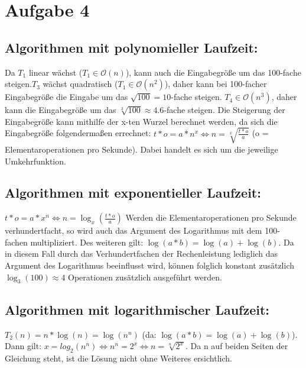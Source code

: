 \documentclass[a4paper,10pt]{article}
\begin{document}
\section{Aufgabe 4}
\subsection{Algorithmen mit polynomieller Laufzeit:}
Da $T_1$ linear wächst ($T_1 \in \mathcal{O}(n)$), kann auch die Eingabegröße um das 100-fache steigen.\newline $T_3$ wächst quadratisch
($T_1 \in \mathcal{O}(n^2)$), daher kann bei 100-facher Eingabegröße die Eingabe um das $\sqrt{100} = 10$-fache steigen. \newline $T_4 \in \mathcal{O}(n^3)$,
daher kann die Eingabegröße um das $\sqrt[3]{100} \approx 4.6$-fache steigen.\newline
Die Steigerung der Eingabegröße kann mithilfe der x-ten Wurzel berechnet werden, da sich die Eingabegröße folgendermaßen errechnet:\newline
$t*o = a*n^x \Leftrightarrow n = \sqrt[x]{\frac{t*o}{a}}$ (o = Elementaroperationen pro Sekunde). Dabei handelt es sich um die jeweilige
Umkehrfunktion.

\subsection{Algorithmen mit exponentieller Laufzeit:}
$t*o = a*x^n \Leftrightarrow n = \log_x(\frac{t*o}{a})$ \newline
Werden die Elementaroperationen pro Sekunde verhundertfacht, so wird auch das Argument des Logarithmus mit dem 100-fachen multipliziert.
Des weiteren gilt:\newline
$\log(a*b) = \log(a) + \log(b)$. Da in diesem Fall durch das Verhundertfachen der Rechenleistung lediglich das Argument des 
Logarithmus beeinflusst wird, können folglich konstant zusätzlich $\log_3(100) \approx 4$ Operationen zusätzlich ausgeführt werden.

\subsection{Algorithmen mit logarithmischer Laufzeit:}
$T_2(n) = n*\log(n) = \log(n^n)$ (da: $\log(a*b) = \log(a) + \log(b)$).\newline
Dann gilt: $x = log_2(n^n) \Leftrightarrow n^n = 2^x \Leftrightarrow n = \sqrt[n]{2^x}$. Da n auf beiden Seiten der Gleichung steht,
ist die Lösung nicht ohne Weiteres ersichtlich.
\end{document}
